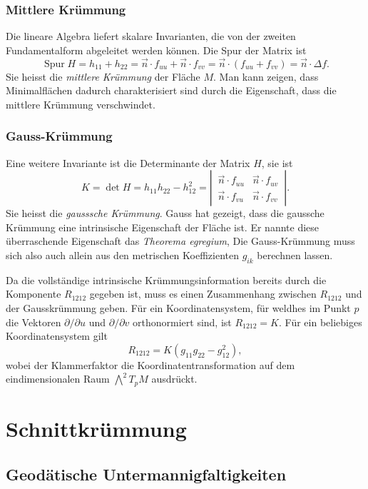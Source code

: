 %
%
\subsubsection{Mittlere Krümmung}
Die lineare Algebra liefert skalare Invarianten, die von der zweiten
Fundamentalform abgeleitet werden können.
Die Spur der Matrix ist
\[
\operatorname{Spur} H
=
h_{11}
+
h_{22}
=
\vec{n}\cdot f_{uu}
+
\vec{n}\cdot f_{vv}
=
\vec{n}\cdot(f_{uu}+f_{vv})
=
\vec{n}\cdot\Delta f.
\]
Sie heisst die \emph{mittlere Krümmung} der Fläche $M$.
Man kann zeigen, dass Minimalflächen dadurch charakterisiert sind
durch die Eigenschaft, dass die mittlere Krümmung verschwindet.

%
%
\subsubsection{Gauss-Krümmung}
Eine weitere Invariante ist die Determinante der Matrix $H$, sie ist
\[
K
=
\det H
=
h_{11}h_{22}-h_{12}^2
=
\left|\,\begin{matrix}
\vec{n}\cdot f_{uu} & \vec{n}\cdot f_{uv} \\
\vec{n}\cdot f_{vu} & \vec{n}\cdot f_{vv}
\end{matrix}\,\right|.
\]
Sie heisst die \emph{gausssche Krümmung}.
Gauss hat gezeigt, dass die gaussche Krümmung eine intrinsische Eigenschaft
der Fläche ist.
Er nannte diese überraschende Eigenschaft das \emph{Theorema egregium}, 
Die Gauss-Krümmung muss sich also auch allein aus den metrischen
Koeffizienten $g_{ik}$ berechnen lassen.

Da die vollständige intrinsische Krümmungsinformation bereits durch die
Komponente $R_{1212}$ gegeben ist, muss es einen Zusammenhang zwischen
$R_{1212}$ und der Gausskrümmung geben.
Für ein Koordinatensystem, für weldhes im Punkt $p$  die Vektoren
$\partial/\partial u$ und $\partial/\partial v$ orthonormiert sind,
ist $R_{1212}=K$.
Für ein beliebiges Koordinatensystem gilt
\[
R_{1212}
=
K(g_{11}g_{22}-g_{12}^2),
\]
wobei der Klammerfaktor die Koordinatentransformation auf dem 
eindimensionalen Raum $\bigwedge^2 T_pM$ ausdrückt.

%
%
\section{Schnittkrümmung
\label{buch:kruemmung:section:schnittkruemmung}}

\subsection{Geodätische Untermannigfaltigkeiten}

